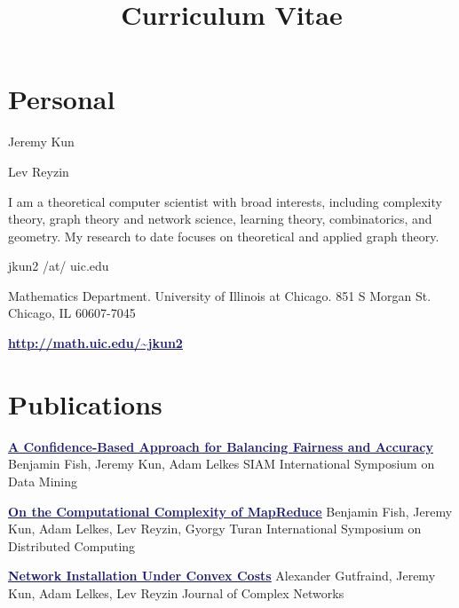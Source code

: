 \documentclass[11pt]{moderncv}
\title{Curriculum Vitae}
\begin{document}
   \maketitle

      \section{Personal}
         {Jeremy Kun}

         {Lev Reyzin}

         {I am a theoretical computer scientist with broad interests, including complexity theory, graph theory and network science, learning theory, combinatorics, and geometry. My research to date focuses on theoretical and applied graph theory.}

         {jkun2 /at/ uic.edu}

         {Mathematics Department. University of Illinois at Chicago. 851 S Morgan St. Chicago, IL 60607-7045}

         {\href{http://math.uic.edu/~jkun2}{\textcolor{MidnightBlue}{\underline{\textbf{http://math.uic.edu/\textasciitilde{}jkun2}}}}}


   \section{Publications}
         {\href{}{\textcolor{MidnightBlue}{\underline{\textbf{A Confidence-Based Approach for Balancing Fairness and Accuracy}}}}}
      {Benjamin Fish, Jeremy Kun, Adam Lelkes}
      {SIAM International Symposium on Data Mining}
      {}
      {}

         {\href{http://arxiv.org/abs/1410.0245}{\textcolor{MidnightBlue}{\underline{\textbf{On the Computational Complexity of MapReduce}}}}}
      {Benjamin Fish, Jeremy Kun, Adam Lelkes, Lev Reyzin, Gyorgy Turan}
      {International Symposium on Distributed Computing}
      {}
      {}

         {\href{http://comnet.oxfordjournals.org/cgi/content/abstract/cnv020?ijkey=ZiDO26VV0vKrRIO&keytype=ref}{\textcolor{MidnightBlue}{\underline{\textbf{Network Installation Under Convex Costs}}}}}
      {Alexander Gutfraind, Jeremy Kun, Adam Lelkes, Lev Reyzin}
      {Journal of Complex Networks}
      {}
      {}
\end{document}

